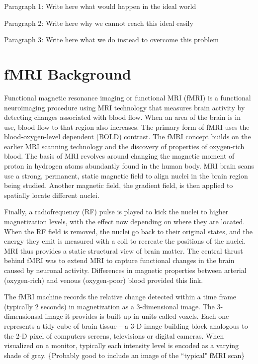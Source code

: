 
Paragraph 1: Write here what would happen in the ideal world

Paragraph 2: Write here why we cannot reach this ideal easily

Paragraph 3: Write here what we do instead to overcome this problem

\section{fMRI Background}

{\color{blue}

Functional magnetic resonance imaging or functional MRI (fMRI) is a
functional neuroimaging procedure using MRI technology that measures
brain activity by detecting changes associated with blood flow.
When an area of the brain is in use, blood flow to that region also
increases. The primary form of fMRI uses the blood-oxygen-level
dependent (BOLD) contrast. The fMRI concept builds on the earlier MRI
scanning technology and the discovery of properties of oxygen-rich
blood. 
The basis of MRI revolves around changing the magnetic moment of proton
in hydrogen atoms abundantly found in the human body. MRI brain scans
use a strong, permanent, static magnetic field to align nuclei in the
brain region being studied. Another magnetic field, the gradient field,
is then applied to spatially locate different nuclei.

Finally, a radiofrequency (RF) pulse is played to kick the nuclei to
higher magnetization levels, with the effect now depending on where
they are located. When the RF field is removed, the nuclei go back to
their original states, and the energy they emit is measured with a coil
to recreate the positions of the nuclei. MRI thus provides a static
structural view of brain matter. The central thrust behind fMRI was to
extend MRI to capture functional changes in the brain caused by
neuronal activity. Differences in magnetic properties between arterial
(oxygen-rich) and venous (oxygen-poor) blood provided this link.

The fMRI machine records the relative change detected within a time
frame (typically 2 seconds) in magnetization as a 3-dimensional image.
The 3-dimensionsal image it provides is built up in units called
voxels. Each one represents a tidy cube of brain tissue -- a 3-D image
building block analogous to the 2-D pixel of computers screens,
televisions or digital cameras. When visualized on a monitor, typically
each intensity level is encoded as a varying shade of gray. \{Probably
good to include an image of the ``typical" fMRI scan\}

}
